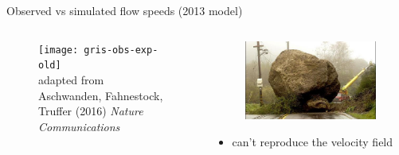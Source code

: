 \documentclass[hide notes,intlimits]{beamer}
\begin{document}
\begin{frame}{Observed vs simulated flow speeds (2013 model)}
  \begin{columns}[c]
    \begin{column}{.6\linewidth}
    \begin{figure}
      \texttt{[image: gris-obs-exp-old]}
      \\ \tiny{adapted from Aschwanden, Fahnestock, Truffer (2016) \textit{Nature Communications}}
    \end{figure}
    \end{column}
    \begin{column}{.4\linewidth}
      \begin{figure}
        \includegraphics[width=\textwidth]{roadblocks}
      \end{figure}
      \begin{itemize}
      \item can't reproduce the velocity field
      \end{itemize}
    \end{column}
  \end{columns}
  \note[item]{}
\end{frame}
\end{document}
